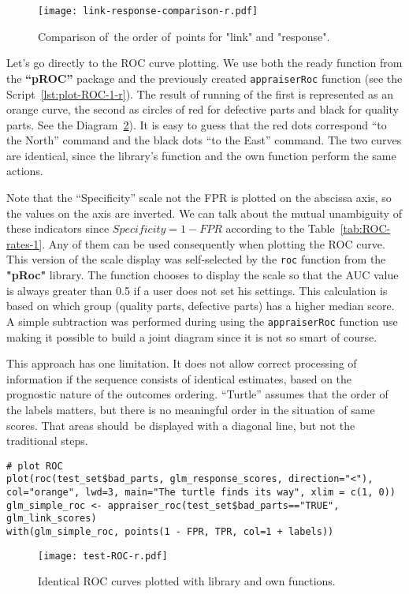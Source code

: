 \documentclass[]{scrreprt}
\begin{document}
%
\begin{figure}[htp]
	\centering
	\texttt{[image: link-response-comparison-r.pdf]}
	\caption{Comparison of~the order of~points for "link" and "response".}
	\label{fig:link-response-comparison-r}
\end{figure}
%

Let's go directly to the ROC curve plotting. We use both the ready function from the \textbf{``pROC''} package and the previously created \texttt{appraiserRoc} function (see the Script~\ref{lst:plot-ROC-1-r}). The result of running of the first is represented as an orange curve, the second as circles of red for defective parts and black for quality parts. See the Diagram~\ref{fig:test-ROC-r}). It is easy to guess that the red dots correspond ``to the North'' command and the black dots ``to the East'' command. The two curves are identical, since the library's function and the own function perform the same actions.

Note that the ``Specificity'' scale not the FPR is plotted on the abscissa axis, so the values on the axis are inverted. We can talk about the mutual unambiguity of these indicators since $Specificity = 1 - FPR$ according to the Table~\ref{tab:ROC-rates-1}. Any of them can be used consequently when plotting the ROC curve. This version of the scale display was self-selected by the \texttt{roc} function from the \textbf{"pRoc"} library. The function chooses to display the scale so that the AUC value is always greater than 0.5 if a user does not set his settings. This calculation is based on which group (quality parts, defective parts) has a higher median score. A simple subtraction was performed during using the \texttt{appraiserRoc} function use making it possible to build a joint diagram since it is not so smart of course.

This approach has one limitation.  It does not allow correct processing of information if the sequence consists of identical estimates, based on the prognostic nature of the outcomes ordering. ``Turtle'' assumes that the order of the labels matters, but there is no meaningful order in the situation of same scores. That areas should~be displayed with a diagonal line, but not the traditional steps.
%
\begin{lstlisting}[float=htp, caption = Plotting the ROC curve using library and own functions, firstnumber=1, label= lst:plot-ROC-1-r]
# plot ROC
plot(roc(test_set$bad_parts, glm_response_scores, direction="<"),
col="orange", lwd=3, main="The turtle finds its way", xlim = c(1, 0))
glm_simple_roc <- appraiser_roc(test_set$bad_parts=="TRUE", glm_link_scores)
with(glm_simple_roc, points(1 - FPR, TPR, col=1 + labels))
\end{lstlisting}
%
\begin{figure}[htp]
	\centering
	\texttt{[image: test-ROC-r.pdf]}
	\caption{Identical ROC curves plotted with library and own functions.}
	\label{fig:test-ROC-r}
\end{figure}
%
\end{document}
